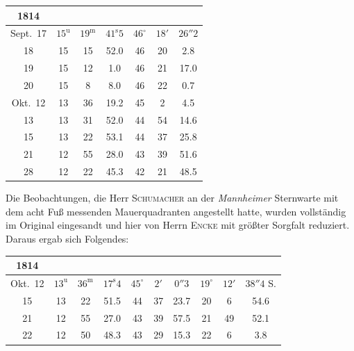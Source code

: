 \begin{center}\fontsize{9}{11}\selectfont\setlength{\tabcolsep}{3pt}\renewcommand{\arraystretch}{1.15}\begin{tabular}{c|ccc|ccc}
1814 &  &  \\
\hline
Sept.\ 17  & $15^{\mathrm u}$ & $19^{\mathrm m}$ & $41^{\mathrm s}5$ & $46^{\circ}$ & $18'$ & $26''2$ \\
18         & 15 & 15 & 52.0 & 46 & 20 & 2.8 \\
19         & 15 & 12 & 1.0  & 46 & 21 & 17.0 \\
20         & 15 & 8  & 8.0  & 46 & 22 & 0.7 \\
Okt.\ 12 & 13 & 36 & 19.2 & 45 & 2  & 4.5 \\
13         & 13 & 31 & 52.0 & 44 & 54 & 14.6 \\
15         & 13 & 22 & 53.1 & 44 & 37 & 25.8 \\
21         & 12 & 55 & 28.0 & 43 & 39 & 51.6 \\
28         & 12 & 22 & 45.3 & 42 & 21 & 48.5 \\
\end{tabular}\end{center}

\par\indent Die Beobachtungen, die Herr \textsc{Schumacher} an der \emph{Mannheimer} Sternwarte mit dem acht Fuß messenden Mauerquadranten angestellt hatte, wurden vollständig im Original eingesandt und hier von Herrn \textsc{Encke} mit größter Sorgfalt reduziert. Daraus ergab sich Folgendes:

\begin{center}\fontsize{9}{11}\selectfont\setlength{\tabcolsep}{3pt}\renewcommand{\arraystretch}{1.15}\begin{tabular}{c|ccc|ccc|ccc}
1814 &  &  &  \\
\hline
Okt.\ 12 & $13^{\mathrm u}$ & $36^{\mathrm m}$ & $17^{\mathrm s}4$ & $45^{\circ}$ & $2'$  & $0''3$  & $19^{\circ}$ & $12'$ & $38''4$ S. \\
15         & 13 & 22 & 51.5 & 44 & 37 & 23.7 & 20 & 6  & 54.6 \\
21         & 12 & 55 & 27.0 & 43 & 39 & 57.5 & 21 & 49 & 52.1 \\
22         & 12 & 50 & 48.3 & 43 & 29 & 15.3 & 22 & 6  & 3.8  \\
\end{tabular}\end{center}

